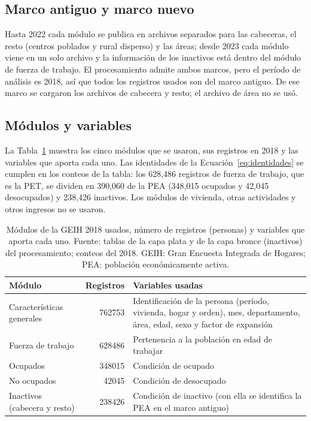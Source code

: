\subsection{Marco antiguo y marco nuevo}

Hasta 2022 cada módulo se publica en archivos separados para las cabeceras, el resto (centros poblados y rural disperso) y las áreas; desde 2023 cada módulo viene en un solo archivo y la información de los inactivos está dentro del módulo de fuerza de trabajo. El procesamiento admite ambos marcos, pero el período de análisis es 2018, así que todos los registros usados son del marco antiguo. De ese marco se cargaron los archivos de cabecera y resto; el archivo de área no se usó.

\subsection{Módulos y variables}

La Tabla~\ref{tab:dimensiones-geih-modulos} muestra los cinco módulos que se usaron, sus registros en 2018 y las variables que aporta cada uno. Las identidades de la Ecuación~\ref{eq:identidades} se cumplen en los conteos de la tabla: los 628,486 registros de fuerza de trabajo, que es la PET, se dividen en 390,060 de la PEA (348,015 ocupados y 42,045 desocupados) y 238,426 inactivos. Los módulos de vivienda, otras actividades y otros ingresos no se usaron.

\begin{table}[!htbp]
\centering
\small
\caption[Módulos de la GEIH 2018 usados]{Módulos de la GEIH 2018 usados, número de registros (personas) y variables que aporta cada uno. Fuente: tablas de la capa plata y de la capa bronce (inactivos) del procesamiento; conteos del 2018. GEIH: Gran Encuesta Integrada de Hogares; PEA: población económicamente activa.}
\label{tab:dimensiones-geih-modulos}
\renewcommand{\arraystretch}{1.15}
\begin{tabularx}{\linewidth}{>{\raggedright\arraybackslash}p{3.2cm} r >{\raggedright\arraybackslash}X}
\toprule
Módulo & Registros & Variables usadas \\
\midrule
Características generales & \num{762753} & Identificación de la persona (período, vivienda, hogar y orden), mes, departamento, área, edad, sexo y factor de expansión \\
Fuerza de trabajo & \num{628486} & Pertenencia a la población en edad de trabajar \\
Ocupados & \num{348015} & Condición de ocupado \\
No ocupados & \num{42045} & Condición de desocupado \\
Inactivos (cabecera y resto) & \num{238426} & Condición de inactivo (con ella se identifica la PEA en el marco antiguo) \\
\bottomrule
\end{tabularx}
\end{table}

